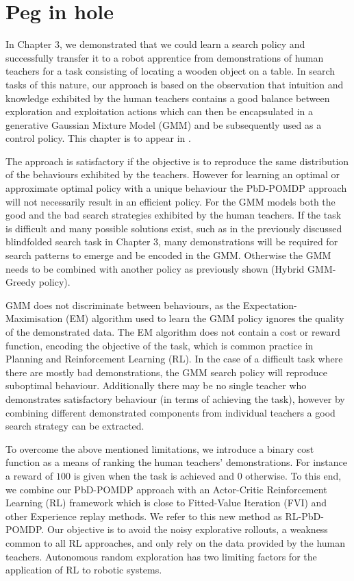 \chapter{Peg in hole}

In Chapter 3, we demonstrated that we could learn a search policy and successfully transfer it to a robot apprentice
from demonstrations of human teachers for a task consisting of locating a wooden object on a table. 
In search tasks of this nature, our approach is based on the observation that intuition and knowledge exhibited by the human teachers 
contains a good balance between exploration and exploitation actions which can then be encapsulated in 
a generative Gaussian Mixture Model (GMM) and be subsequently used as a control policy. This chapter is to appear in
\cite{FPI_Chambrier2016}.

The approach is satisfactory if the objective is to reproduce the same distribution of the behaviours exhibited by 
the teachers. However for learning an optimal or approximate optimal policy with a unique behaviour the 
PbD-POMDP approach will not necessarily result in an efficient policy. For the GMM models
both the good and the bad search strategies exhibited by the human teachers. If the task is difficult and many possible solutions exist, such 
as in the previously discussed blindfolded search task in Chapter 3, many demonstrations will be required for search patterns to
emerge and be encoded in the GMM. Otherwise the GMM needs to be combined with another policy as previously shown (Hybrid GMM-Greedy 
policy). 

GMM does not discriminate between behaviours, as the \sloppy Expectation-Maximisation (EM) algorithm used to 
learn the GMM policy ignores the quality of the demonstrated data. The EM algorithm does not contain a cost or 
reward function, encoding the objective of the task, which is common practice in Planning and Reinforcement Learning (RL). 
In the case of a difficult task where there are mostly bad demonstrations, the GMM search policy will reproduce suboptimal behaviour.
Additionally there may be no single teacher who demonstrates satisfactory behaviour (in terms of achieving the task), however by combining 
different demonstrated components from individual teachers a good search strategy can be extracted.


To overcome the above mentioned limitations, we introduce a binary cost function as a means of ranking the human teachers' demonstrations.
For instance a reward of $100$ is given when the task is achieved and $0$ otherwise.
To this end, we combine our PbD-POMDP approach with an Actor-Critic Reinforcement Learning (RL) framework which 
is close to Fitted-Value Iteration (FVI) and other Experience replay methods. We refer to this new method as RL-PbD-POMDP. 
Our objective is to avoid the noisy explorative rollouts, a weakness common to all RL approaches, and only rely on 
the data provided by the human teachers. Autonomous random exploration has two limiting factors for the application of RL
to robotic systems.

